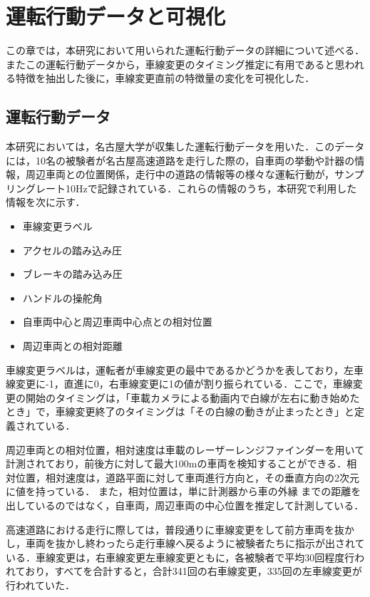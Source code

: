 \chapter{運転行動データと可視化}
この章では，本研究において用いられた運転行動データの詳細について述べる．またこの運転行動データから，車線変更のタイミング推定に有用であると思われる特徴を抽出した後に，車線変更直前の特徴量の変化を可視化した．
\section{運転行動データ}
本研究においては，名古屋大学が収集した運転行動データを用いた．このデータには，10名の被験者が名古屋高速道路を走行した際の，自車両の挙動や計器の情報，周辺車両との位置関係，走行中の道路の情報等の様々な運転行動が，サンプリングレート10Hzで記録されている．これらの情報のうち，本研究で利用した情報を次に示す．
\begin{itemize}
 \item 車線変更ラベル
 \item アクセルの踏み込み圧
 \item ブレーキの踏み込み圧
 \item ハンドルの操舵角
 \item 自車両中心と周辺車両中心点との相対位置
 \item 周辺車両との相対距離
\end{itemize}
\par
車線変更ラベルは，運転者が車線変更の最中であるかどうかを表しており，左車線変更に-1，直進に0，右車線変更に1の値が割り振られている．ここで，車線変更の開始のタイミングは，「車載カメラによる動画内で白線が左右に動き始めたとき」で，車線変更終了のタイミングは「その白線の動きが止まったとき」と定義されている．
\par
周辺車両との相対位置，相対速度は車載のレーザーレンジファインダーを用いて計測されており，前後方に対して最大100mの車両を検知することができる．相対位置，相対速度は，道路平面に対して車両進行方向と，その垂直方向の2次元に値を持っている．%
また，相対位置は，単に計測器から車の外縁%
までの距離を出しているのではなく，自車両，周辺車両の中心位置を推定して計測している．
\par
高速道路における走行に際しては，普段通りに車線変更をして前方車両を抜かし，車両を抜かし終わったら走行車線へ戻るように被験者たちに指示が出されている．車線変更は，右車線変更左車線変更ともに，各被験者で平均30回程度行われており，すべてを合計すると，合計341回の右車線変更，335回の左車線変更が行われていた．
